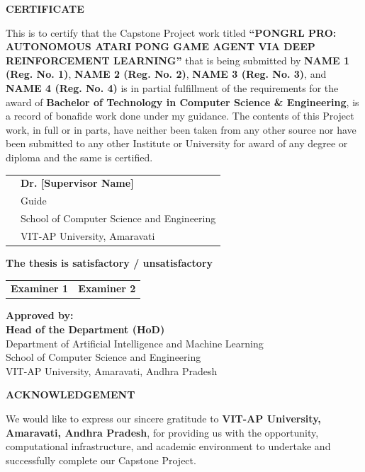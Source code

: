\documentclass[12pt,a4paper]{report}
\begin{document}
\newpage
\thispagestyle{plain}
\begin{center}
    \large \textbf{CERTIFICATE}
\end{center}
\vspace{0.8cm}
This is to certify that the Capstone Project work titled \textbf{``PONGRL PRO: AUTONOMOUS ATARI PONG GAME AGENT VIA DEEP REINFORCEMENT LEARNING''} that is being submitted by \textbf{NAME 1 (Reg. No. 1)}, \textbf{NAME 2 (Reg. No. 2)}, \textbf{NAME 3 (Reg. No. 3)}, and \textbf{NAME 4 (Reg. No. 4)} is in partial fulfillment of the requirements for the award of \textbf{Bachelor of Technology in Computer Science \& Engineering}, is a record of bonafide work done under my guidance. The contents of this Project work, in full or in parts, have neither been taken from any other source nor have been submitted to any other Institute or University for award of any degree or diploma and the same is certified.

\vspace{2.5cm}
\noindent
\begin{tabular}{@{}p{3.5in}p{2.5in}@{}}
& \textbf{Dr. [Supervisor Name]} \\
& Guide \\
& School of Computer Science and Engineering \\
& VIT-AP University, Amaravati
\end{tabular}

\vspace{1.5cm}
\noindent
\textbf{The thesis is satisfactory / unsatisfactory}

\vspace{1.5cm}
\noindent
\begin{tabular}{@{}p{3.5in}p{2.5in}@{}}
\textbf{Examiner 1} & \textbf{Examiner 2}
\end{tabular}

\vspace{1.5cm}
\noindent
\textbf{Approved by:} \\
\textbf{Head of the Department (HoD)} \\
Department of Artificial Intelligence and Machine Learning \\
School of Computer Science and Engineering \\
VIT-AP University, Amaravati, Andhra Pradesh

\newpage
\thispagestyle{plain}
\begin{center}
    \large \textbf{ACKNOWLEDGEMENT}
\end{center}
\vspace{0.5cm}
We would like to express our sincere gratitude to \textbf{VIT-AP University, Amaravati, Andhra Pradesh}, for providing us with the opportunity, computational infrastructure, and academic environment to undertake and successfully complete our Capstone Project.
\end{document}
